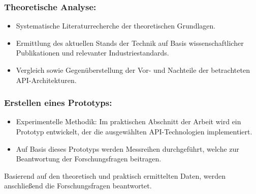 \subsubsection*{Theoretische Analyse:}
\begin{itemize}
	\item Systematische Literaturrecherche der theoretischen Grundlagen.
	\item Ermittlung des aktuellen Stands der Technik auf Basis wissenschaftlicher Publikationen und relevanter Industriestandards.
	\item Vergleich sowie Gegenüberstellung der Vor- und Nachteile der betrachteten API-Architekturen.
\end{itemize}

\subsubsection*{Erstellen eines Prototyps:}
\begin{itemize}
	\item Experimentelle Methodik: Im praktischen Abschnitt der Arbeit wird ein Prototyp
	entwickelt, der die ausgewählten API-Technologien implementiert.
	\item Auf Basis dieses Prototyps werden Messreihen durchgeführt, welche zur Beantwortung der Forschungsfragen beitragen.
\end{itemize}

Basierend auf den theoretisch und praktisch ermittelten Daten, werden anschließend
die Forschungsfragen beantwortet.
\chapterend

